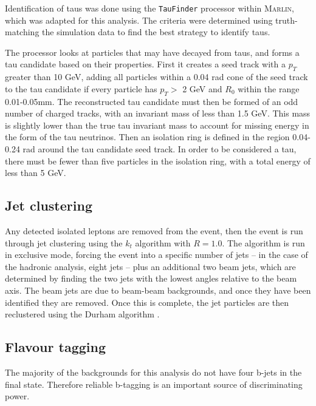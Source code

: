 Identification of taus was done using the \texttt{TauFinder} processor\cite{taufinder} within \textsc{Marlin}, which was adapted for this analysis. The criteria were determined using truth-matching the simulation data to find the best strategy to identify taus.

The processor looks at particles that may have decayed from taus, and forms a tau candidate based on their properties. First it creates a seed track with a $p_T$ greater than 10 GeV, adding all particles within a 0.04 rad cone of the seed track to the tau candidate if every particle has $p_T >$ 2 GeV and $R_0$ within the range 0.01-0.05mm. The reconstructed tau candidate must then be formed of an odd number of charged tracks, with an invariant mass of less than 1.5 GeV. This mass is slightly lower than the true tau invariant mass to account for missing energy in the form of the tau neutrinos. Then an isolation ring is defined in the region 0.04-0.24 rad around the tau candidate seed track. In order to be considered a tau, there must be fewer than five particles in the isolation ring, with a total energy of less than 5 GeV.

\subsection{Jet clustering}
Any detected isolated leptons are removed from the event, then the event is run through jet clustering using the $k_t$ algorithm \cite{kt-jet-clustering} with $R = 1.0$. The algorithm is run in exclusive mode, forcing the event into a specific number of jets -- in  the case of the hadronic analysis, eight jets -- plus an additional two beam jets, which are determined by finding the two jets with the lowest angles relative to the beam axis. The beam jets are due to beam-beam backgrounds, and once they have been identified they are removed. Once this is complete, the jet particles are then reclustered using the Durham algorithm \cite{durham-jet-clustering}.

\subsection{Flavour tagging}
\label{section:flavour-tagging}
The majority of the backgrounds for this analysis do not have four b-jets in the final state. Therefore reliable b-tagging is an important source of discriminating power.


